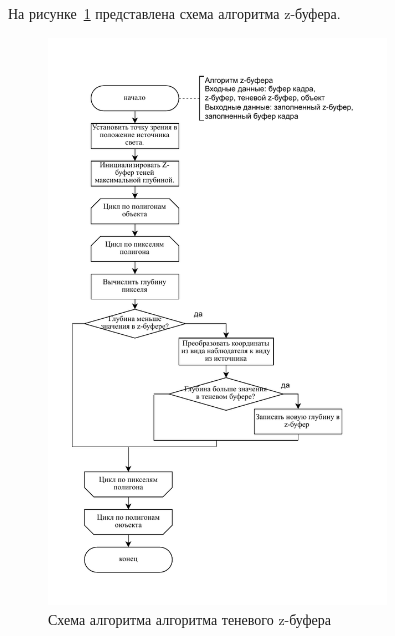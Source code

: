 На рисунке~\ref{fig:cloud_fc1} представлена схема алгоритма z-буфера.
\begin{figure}[H]
	\centering
	\includegraphics[width=0.8\textwidth, page=1]{assets/img/z_buf_shadow_alg.pdf}   
	\caption{Схема алгоритма алгоритма теневого z-буфера}
	\label{fig:cloud_fc1}
\end{figure}

